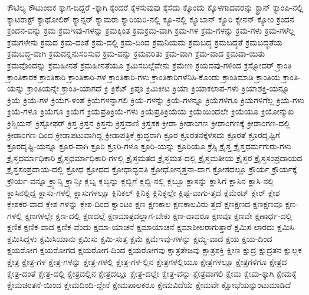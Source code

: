 {ಕೌಟಿಲ್ಯ
ಕೌಟುಂಬಿಕ
ಕ್ಕಾಗ-ದಿದ್ದರೆ
-ಕ್ಕಾಗಿ
ಕ್ಕೆಂದರೆ
ಕ್ಕೆಳಸುವುವು
ಕ್ಕೆಸೆದು
ಕ್ಕೊಂದು
ಕ್ಕೊಳಗಾದವರನ್ನು
ಕ್ಟ್ರಾನ್
ಕ್ಯಾಂಪಿ-ನಲ್ಲಿ
ಕ್ಯಾಟರಾಕ್ಟ್
ಕ್ಯಾಥೋಲಿಕ್
ಕ್ಯಾನ್ಸರ್
ಕ್ಯಾಮರಾ
ಕ್ಯಾರಿಯರಿ-ನಲ್ಲಿ
ಕ್ಯೂ-ನಲ್ಲಿ
ಕ್ಯೂಬಾನ್
ಕ್ಯೂರಿ
ಕ್ಯೇನನ್
ಕ್ಯೋಂ
ಕ್ರಂದನ
ಕ್ರಂದನ-ವನ್ನು
ಕ್ರಮ
ಕ್ರಮಇವು-ಗಳನ್ನು
ಕ್ರಮಕ್ಕಿಂತ
ಕ್ರಮಕ್ರಮ-ವಾಗಿ
ಕ್ರಮ-ಗಳ
ಕ್ರಮ-ಗಳನ್ನು
ಕ್ರಮ-ಗಳು
ಕ್ರಮ-ಗಳೆಲ್ಲ
ಕ್ರಮಗಳೇನು
ಕ್ರಮದ
ಕ್ರಮ-ದಂತೆ
ಕ್ರಮ-ದಲ್ಲಿ
ಕ್ರಮ-ದಿಂದ
ಕ್ರಮನಿಯಮ
ಕ್ರಮಬದ್ಧ
ಕ್ರಮಬದ್ಧತೆ
ಕ್ರಮಬದ್ಧತೆಯ
ಕ್ರಮಬದ್ಧ-ವಾಗಿ
ಕ್ರಮವನ್ನನುಸರಿಸುವ
ಕ್ರಮ-ವನ್ನು
ಕ್ರಮವರಿತು
ಕ್ರಮ-ವಾಗಿ
ಕ್ರಮ-ವಾದ
ಕ್ರಮವಾ-ಯಿತು
ಕ್ರಮವೊಂದನ್ನು
ಕ್ರಮಹೀನತೆ
ಕ್ರಮಹೀನತೆಯೂ
ಕ್ರಮಿಸಬಲ್ಲೆವೇನು
ಕ್ರಮೇಣ
ಕ್ರಯದವು-ಗಳಿಂದ
ಕ್ರಸ್ನೋದರ್
ಕ್ರಾಂತಿ
ಕ್ರಾಂತಿಕಾರಕ
ಕ್ರಾಂತಿಕಾರಿ
ಕ್ರಾಂತಿಕಾರಿ-ಗಳ
ಕ್ರಾಂತಿಕಾರಿ-ಗಳು
ಕ್ರಾಂತಿಕಾರಿಗಳೆನಿಸಿ-ಕೊಂಡು
ಕ್ರಾಂತಿಮಾಡಿ
ಕ್ರಾಂತಿಯ
ಕ್ರಾಂತಿ-ಯನ್ನು
ಕ್ರಾಂತಿಯನ್ನೇ
ಕ್ರಾಂತಿ-ಯಾಗದೆ
ಕ್ರಿ
ಕ್ರಿಕೆಟ್
ಕ್ರಿಪೂ
ಕ್ರಿಮಿಕೀಟ
ಕ್ರಿಯಾ
ಕ್ರಿಯಾಕಲಾಪ-ಗಳು
ಕ್ರಿಯಾಶಕ್ತಿ-ಯನ್ನೂ
ಕ್ರಿಯೆ
ಕ್ರಿಯೆ-ಗಳ
ಕ್ರಿಯೆಗ-ಳಂತೆ
ಕ್ರಿಯೆಗಳನ್ನಾಗಲಿ
ಕ್ರಿಯೆ-ಗಳನ್ನು
ಕ್ರಿಯೆ-ಗಳನ್ನೂ
ಕ್ರಿಯೆಗಳಿಗೂ
ಕ್ರಿಯೆಗಳಿಗೆಲ್ಲ
ಕ್ರಿಯೆ-ಗಳು
ಕ್ರಿಯೆ-ಗಳೂ
ಕ್ರಿಯೆಗೂ
ಕ್ರಿಯೆಗೆ
ಕ್ರಿಯೆಪ್ರತಿಕ್ರಿಯೆ-ಗಳು
ಕ್ರಿಯೆಪ್ರತಿಕ್ರಿಯೆಯ
ಕ್ರಿಯೆಯಿಂದಲೇ
ಕ್ರಿಯೆಯೂ
ಕ್ರಿಯೋನ್ಮುಖ
ಕ್ರಿಶ್ಚಿಯನ್
ಕ್ರಿಸ್ಟೋಫರ್
ಕ್ರಿಸ್ತ
ಕ್ರಿಸ್ತನ
ಕ್ರಿಸ್ತನು
ಕ್ರಿಸ್ತವಾಣಿ
ಕ್ರಿಸ್ತಶಕ
ಕ್ರೀಡಾ
ಕ್ರೀಡಾಂಗಣ
ಕ್ರೀಡಾಂಗಣಕ್ಕೆ
ಕ್ರೀಡಾಂಗಣ-ದಲ್ಲಿ
ಕ್ರೀಡಾಂಗಣ-ದಿಂದ
ಕ್ರೀಡಾಪಟುವಾಗಿದ್ದ
ಕ್ರೀಡಾಪತ್ರಿಕೆ
ಕ್ರುದ್ಧರಾಗಿ
ಕ್ರೂರ
ಕ್ರೂರತನಕ್ಕೆಳಸದು
ಕ್ರೂರತೆ
ಕ್ರೂರದೃಷ್ಟಿಗೆ
ಕ್ರೂರದೃಷ್ಟಿ-ಯನ್ನೂ
ಕ್ರೂರ-ವಾಗಿ
ಕ್ರೂರಿ
ಕ್ರೂರಿ-ಗಳೂ
ಕ್ರೂರಿ-ಯನ್ನು
ಕ್ರೂರಿಯೂ
ಕ್ರೆಸ್ಸಿ
ಕ್ರೈಸ್ತ
ಕ್ರೈಸ್ತಧರ್ಮಗುರು-ಗಳು
ಕ್ರೈಸ್ತಧರ್ಮಾಧಿಕಾರಿ
ಕ್ರೈಸ್ತಧರ್ಮಾಧಿಕಾರಿ-ಗಳಲ್ಲಿ
ಕ್ರೈಸ್ತಮತದ
ಕ್ರೈಸ್ತಮತ-ದಲ್ಲಿ
ಕ್ರೈಸ್ತಮತೀಯ
ಕ್ರೈಸ್ತರ
ಕ್ರೈಸ್ತಸಂಪ್ರದಾಯದ
ಕ್ರೈಸ್ತಸಂಪ್ರದಾಯ-ದಲ್ಲಿ
ಕ್ರೋಧ
ಕ್ರೋಧದ
ಕ್ರೋಧಾದ್ಭವತಿ
ಕ್ರೋಧೋನ್ಮತ್ತನಾ-ದಾಗ
ಕ್ರೋಶದಲ್ಲೂ
ಕ್ರೌರ್ಯ
ಕ್ರೌರ್ಯಕ್ಕೆ
ಕ್ರೌರ್ಯ-ವನ್ನೂ
ಕ್ರ್ಯಾನ್ಸಿ
ಕ್ರ್ಯಾನ್ಸೀ
ಕ್ಲಬ್ನ
ಕ್ಲಬ್ಬನ್ನು
ಕ್ಲಬ್ಬಿಗೆ
ಕ್ಲಬ್ಬಿ-ನಲ್ಲಿ
ಕ್ಲಬ್ಬೂ
ಕ್ಲಾಸನ್ನು
ಕ್ಲಾಸಿಗೆ
ಕ್ಲಾಸಿನ
ಕ್ಲಾಸಿ-ನಲ್ಲಿ
ಕ್ಲಾಸಿನಲ್ಲಿದ್ದ
ಕ್ಲಾಸು-ಗಳಲ್ಲಿ
ಕ್ಲಾಸುಗಳಲ್ಲೂ
ಕ್ಲಿನಿಕಲ್
ಕ್ಲಿನಿಕ್ನ
ಕ್ಲಿನಿಕ್ನಲ್ಲೇ
ಕ್ಲಿಷ್ಟ-ವಾಗು-ತ್ತದೆ
ಕ್ಲೆಮೆಂಟ್
ಕ್ಲೇರ್
ಕ್ಲೇಶ
ಕ್ಲೇಶಕರ-ವಾದ
ಕ್ಲೇಶ-ಗಳನ್ನು
ಕ್ಲೇಶ-ದಿಂದ
ಕ್ವಾಂಟಂ
ಕ್ಷಣ
ಕ್ಷಣಕಾಲ
ಕ್ಷಣಕಾಲವಿರು-ತ್ತದೆ
ಕ್ಷಣಕ್ಷಣದ
ಕ್ಷಣಕ್ಷಣವೂ
ಕ್ಷಣ-ಗಳಲ್ಲಿ
ಕ್ಷಣಗಳಲ್ಲೇ
ಕ್ಷಣ-ದಲ್ಲಿ
ಕ್ಷಣದಲ್ಲೆ
ಕ್ಷಣಮಾತ್ರದಲ್ಲಾಗ-ಬೇಕು
ಕ್ಷಣ-ವಾದರೂ
ಕ್ಷಣವೂ
ಕ್ಷಣವೇ
ಕ್ಷಣಾರ್ಧ-ದಲ್ಲಿ
ಕ್ಷಣಿಕ
ಕ್ಷಣಿಕ-ವಾದ
ಕ್ಷಣಿಕ-ವೆಂದು
ಕ್ಷಮಾ-ಯಾಚನೆ
ಕ್ಷಮಾಯಾಚನೆ
ಕ್ಷಮಾಶೀಲರಾಗುತ್ತಾರೆ
ಕ್ಷಮಿಸ-ಲಾರದು
ಕ್ಷಮಿಸಿ
ಕ್ಷಮಿಸಿದ್ದಳು
ಕ್ಷಮಿಸಿಯಾನು
ಕ್ಷಮಿಸು
ಕ್ಷಮಿ-ಸುತ್ತ
ಕ್ಷಮೆ
ಕ್ಷಮೆಇವು-ಗಳನ್ನು
ಕ್ಷಮ್ಯ-ವಾದ
ಕ್ಷಯ
ಕ್ಷಯ-ದಿಂದ
ಕ್ಷಯರೋಗ
ಕ್ಷಯರೋಗದ
ಕ್ಷಯರೋಗ-ದಿಂದ
ಕ್ಷಯರೋಗವು
ಕ್ಷಾತ್ರತೇಜವು
ಕ್ಷಾತ್ರಶಕ್ತಿ
ಕ್ಷೀಣ
ಕ್ಷುದ್ರ
ಕ್ಷುದ್ರತನ
ಕ್ಷುಲ್ಲಕ
ಕ್ಷೇತ್ರ
ಕ್ಷೇತ್ರ-ಗಳ
ಕ್ಷೇತ್ರ-ಗಳನ್ನು
ಕ್ಷೇತ್ರ-ಗಳಲ್ಲಿ
ಕ್ಷೇತ್ರ-ಗಳ-ಲ್ಲಿನ
ಕ್ಷೇತ್ರಗಳಲ್ಲಿಯೂ
ಕ್ಷೇತ್ರಗಳಲ್ಲೂ
ಕ್ಷೇತ್ರಗಳಿಗೂ
ಕ್ಷೇತ್ರದ
ಕ್ಷೇತ್ರ-ದಂತೆ
ಕ್ಷೇತ್ರ-ದಲ್ಲಿ
ಕ್ಷೇತ್ರದಲ್ಲಿನ
ಕ್ಷೇತ್ರದಲ್ಲೂ
ಕ್ಷೇತ್ರ-ದಲ್ಲೇ
ಕ್ಷೇತ್ರ-ವನ್ನು
ಕ್ಷೇತ್ರವಾಗಲಿ
ಕ್ಷೇಮ
ಕ್ಷೇಮ-ಕ್ಕಾಗಿ
ಕ್ಷೇಮಕ್ಕೆ
ಕ್ಷೇಮಚಿಂತನೆ-ಯಿಂದ
ಕ್ಷೇಮದಿಂದಿ-ದ್ದೇನೆ
ಕ್ಷೇಮಪಾಲಕರೂ
ಕ್ಷೇಮವಿದೆಯೆ
ಕ್ಷೇಮವೇ
ಕ್ಷೋಭೆಯನ್ನುಂಟುಮಾಡಿದೆ
}
